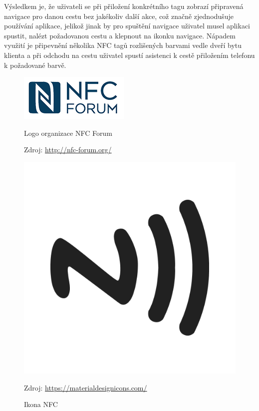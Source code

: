 \documentclass{article}
\begin{document}
Výsledkem je, že uživateli se při přiložení konkrétního tagu zobrazí připravená navigace pro danou
cestu bez jakékoliv další akce, což značně zjednodušuje používání aplikace, jelikož jinak by pro spuštění navigace
uživatel musel aplikaci spustit, nalézt požadovanou cestu a klepnout na ikonku navigace. Nápadem
 využití je připevnění několika NFC tagů rozlišených barvami vedle dveří bytu klienta a při odchodu na
 cestu uživatel spustí asistenci k cestě přiložením telefonu k požadované barvě.

\begin{figure}[H]
\begin{minipage}{.5\textwidth}
\centering
                \includegraphics[scale=0.4]{img/nfc-forum-logo.png}
        \caption{Logo organizace NFC Forum}
        \label{fig:nfcforumlogo}
        \centering Zdroj: \url{http://nfc-forum.org/}
\end{minipage}
\begin{minipage}{.5\textwidth}
\centering
                \includegraphics[scale=0.07]{img/nfc-icon.png}
        \caption{Ikona NFC}
        \centering Zdroj: \url{https://materialdesignicons.com/}
        \label{fig:nfcicon}
    \end{minipage}
\end{figure}
\end{document}
